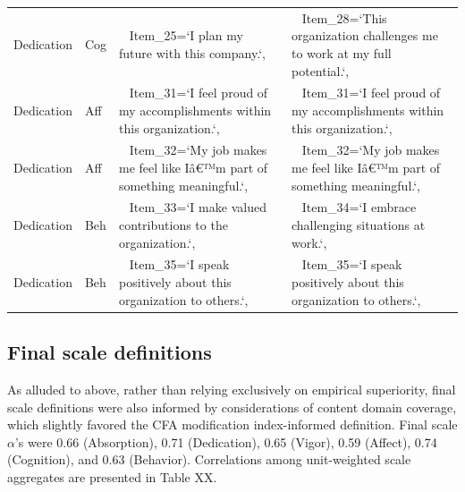 \documentclass[
  english,
  man]{apa7}
\begin{document}
\begin{table}[tbp]
\begin{center}
\begin{threeparttable}
\begin{tabular}{llll}
Dedication & Cog &   Item\_25=`I plan my future with this company.`, &   Item\_28=`This organization challenges me to work at my full potential.`,\\
Dedication & Aff &   Item\_31=`I feel proud of my accomplishments within this organization.`, &   Item\_31=`I feel proud of my accomplishments within this organization.`,\\
Dedication & Aff &   Item\_32=`My job makes me feel like Iâ€™m part of something meaningful.`, &   Item\_32=`My job makes me feel like Iâ€™m part of something meaningful.`,\\
Dedication & Beh &   Item\_33=`I make valued contributions to the organization.`, &   Item\_34=`I embrace challenging situations at work.`,\\
Dedication & Beh &   Item\_35=`I speak positively about this organization to others.`, &   Item\_35=`I speak positively about this organization to others.`,\\
\bottomrule
\end{tabular}

\end{threeparttable}
\end{center}

\end{table}

\hypertarget{final-scale-definitions-1}{%
\subsection{Final scale definitions}\label{final-scale-definitions-1}}

As alluded to above, rather than relying exclusively on empirical superiority, final scale definitions were also informed by considerations of content domain coverage, which slightly favored the CFA modification index-informed definition. Final scale \(\alpha\)'s were 0.66 (Absorption), 0.71 (Dedication), 0.65 (Vigor), 0.59 (Affect), 0.74 (Cognition), and 0.63 (Behavior). Correlations among unit-weighted scale aggregates are presented in Table XX.
\end{document}
